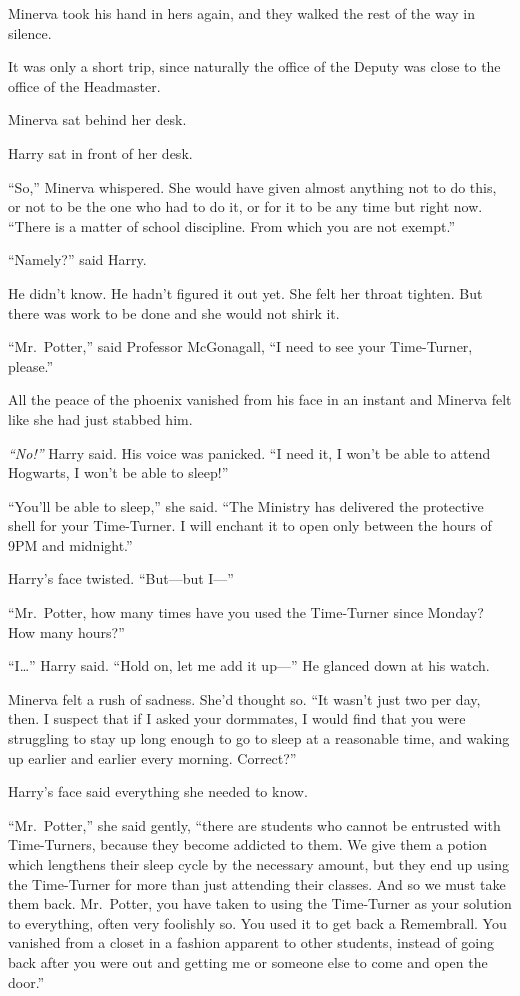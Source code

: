 Minerva took his hand in hers again, and they walked the rest of the way
in silence.

It was only a short trip, since naturally the office of the Deputy was
close to the office of the Headmaster.

Minerva sat behind her desk.

Harry sat in front of her desk.

``So,'' Minerva whispered. She would have given almost anything not to
do this, or not to be the one who had to do it, or for it to be any time
but right now. ``There is a matter of school discipline. From which you
are not exempt.''

``Namely?'' said Harry.

He didn't know. He hadn't figured it out yet. She felt her throat
tighten. But there was work to be done and she would not shirk it.

``Mr.~Potter,'' said Professor McGonagall, ``I need to see your
Time-Turner, please.''

All the peace of the phoenix vanished from his face in an instant and
Minerva felt like she had just stabbed him.

\emph{``No!''} Harry said. His voice was panicked. ``I need it, I won't
be able to attend Hogwarts, I won't be able to sleep!''

``You'll be able to sleep,'' she said. ``The Ministry has delivered the
protective shell for your Time-Turner. I will enchant it to open only
between the hours of 9PM and midnight.''

Harry's face twisted. ``But---but I---''

``Mr.~Potter, how many times have you used the Time-Turner since Monday?
How many hours?''

``I\ldots{}'' Harry said. ``Hold on, let me add it up---'' He glanced
down at his watch.

Minerva felt a rush of sadness. She'd thought so. ``It wasn't just two
per day, then. I suspect that if I asked your dormmates, I would find
that you were struggling to stay up long enough to go to sleep at a
reasonable time, and waking up earlier and earlier every morning.
Correct?''

Harry's face said everything she needed to know.

``Mr.~Potter,'' she said gently, ``there are students who cannot be
entrusted with Time-Turners, because they become addicted to them. We
give them a potion which lengthens their sleep cycle by the necessary
amount, but they end up using the Time-Turner for more than just
attending their classes. And so we must take them back. Mr.~Potter, you
have taken to using the Time-Turner as your solution to everything,
often very foolishly so. You used it to get back a Remembrall. You
vanished from a closet in a fashion apparent to other students, instead
of going back after you were out and getting me or someone else to come
and open the door.''


